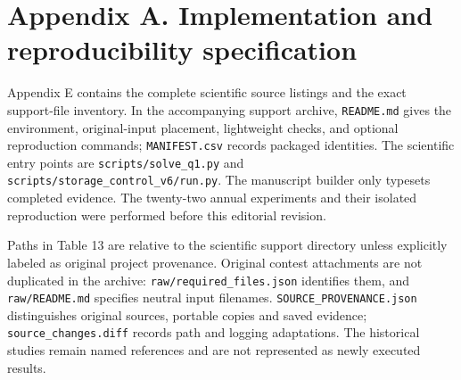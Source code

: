 \clearpage

\section*{Appendix A. Implementation and reproducibility specification}\label{appendix-a.-implementation-and-reproducibility-specification}

Appendix E contains the complete scientific source listings and the exact support-file inventory. In the accompanying support archive, \nolinkurl{README.md} gives the environment, original-input placement, lightweight checks, and optional reproduction commands; \nolinkurl{MANIFEST.csv} records packaged identities. The scientific entry points are \nolinkurl{scripts/solve_q1.py} and \nolinkurl{scripts/storage_control_v6/run.py}. The manuscript builder only typesets completed evidence. The twenty-two annual experiments and their isolated reproduction were performed before this editorial revision.

Paths in Table 13 are relative to the scientific support directory unless explicitly labeled as original project provenance. Original contest attachments are not duplicated in the archive: \nolinkurl{raw/required_files.json} identifies them, and \nolinkurl{raw/README.md} specifies neutral input filenames. \nolinkurl{SOURCE_PROVENANCE.json} distinguishes original sources, portable copies and saved evidence; \nolinkurl{source_changes.diff} records path and logging adaptations. The historical studies remain named references and are not represented as newly executed results.

\Needspace{127.4pt}
\begingroup
\fontsize{9.0}{10.8}\selectfont
\setlength{\tabcolsep}{3.2pt}
\renewcommand{\arraystretch}{1.12}
\setlength{\LTleft}{0pt plus 1fill}\setlength{\LTright}{0pt plus 1fill}
\setlength{\LTcapwidth}{\linewidth}

